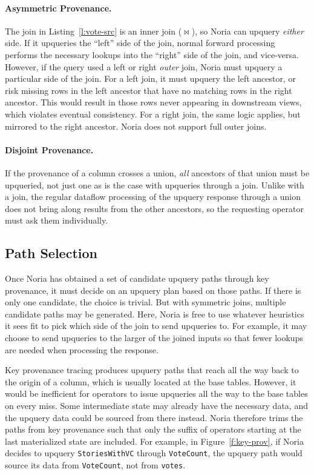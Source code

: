 \paragraph{Asymmetric Provenance.}
The join in Listing~\ref{l:vote-src} is an inner join ($\bowtie$), so Noria can
upquery \emph{either} side. If it upqueries the ``left'' side of the join,
normal forward processing performs the necessary lookups into the ``right'' side
of the join, and vice-versa. However, if the query used a left or right
\emph{outer} join, Noria must upquery a particular side of the join. For a left
join, it must upquery the left ancestor, or risk missing rows in the left
ancestor that have no matching rows in the right ancestor. This would result in
those rows never appearing in downstream views, which violates eventual
consistency. For a right join, the same logic applies, but mirrored to the right
ancestor. Noria does not support full outer joins.

\paragraph{Disjoint Provenance.}
If the provenance of a column crosses a union, \emph{all} ancestors of that
union must be upqueried, not just one as is the case with upqueries through a
join. Unlike with a join, the regular dataflow processing of the upquery
response through a union does not bring along results from the other ancestors,
so the requesting operator must ask them individually.

\subsection{Path Selection}
\label{s:upquery:selection}

Once Noria has obtained a set of candidate upquery paths through key provenance,
it must decide on an upquery plan based on those paths. If there is only one
candidate, the choice is trivial. But with symmetric joins, multiple candidate
paths may be generated. Here, Noria is free to use whatever heuristics it sees
fit to pick which side of the join to send upqueries to. For example, it may
choose to send upqueries to the larger of the joined inputs so that fewer
lookups are needed when processing the response.

Key provenance tracing produces upquery paths that reach all the way back to the
origin of a column, which is usually located at the base tables. However, it
would be inefficient for operators to issue upqueries all the way to the base
tables on every miss. Some intermediate state may already have the necessary
data, and the upquery data could be sourced from there instead. Noria therefore
trims the paths from key provenance such that only the suffix of operators
starting at the last materialized state are included. For example, in
Figure~\ref{f:key-prov}, if Noria decides to upquery \texttt{StoriesWithVC}
through \texttt{VoteCount}, the upquery path would source its data from
\texttt{VoteCount}, not from \texttt{votes}.

